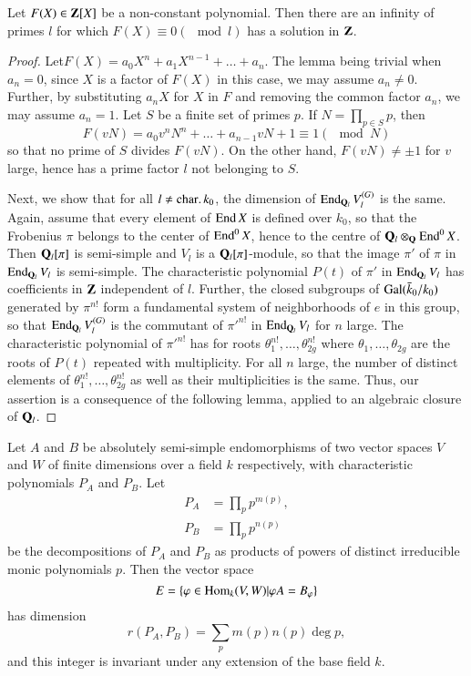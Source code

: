 \begin{lem}\label{apen1-lem5}
Let $F(X) \in \mathbf{Z}[X]$ be a non-constant polynomial. Then there are an infinity of primes $l$ for which $F(X) \equiv 0 (\mod l)$ has a solution in $\mathbf{Z}$.
\end{lem}

\begin{proof}
Let\pageoriginale $F(X) = a_0 X^n + a_1 X^{n-1} + \ldots + a_n$. The lemma being trivial when $a_n =0$, since $X$ is a factor of $F(X)$ in this case, we may assume $a_n \neq 0$. Further, by substituting $a_n X$ for $X$ in $F$ and removing the common factor $a_n$, we may assume $a_n =1$. Let $S$ be a finite set of primes $p$. If $N = \prod\limits_{p\in S} p$, then
$$
F(vN) = a_0 v^n N^n+ \ldots + a_{n-1} v N+ 1 \equiv 1 (\mod N)
$$
so that no prime of $S$ divides $F(vN)$. On the other hand, $F(vN) \neq \pm 1$ for $v$ large, hence has a prime factor $l$ not belonging to $S$.

Next, we show that for all $l \neq \operatorname{char} \ldotp k_0$, the dimension of $\operatorname{End}_{\mathbf{Q}_l} V_l^{(G)}$ is the same. Again, assume that every element of $\operatorname{End} X$ is defined over $k_0$, so that the Frobenius $\pi$ belongs to the center of $\operatorname{End}^0 X$, hence to the centre of $\mathbf{Q}_l \otimes_{\mathbf{Q}} \operatorname{End}^0 X$. Then $\mathbf{Q}_l [\pi]$ is semi-simple and $V_l$ is a $\mathbf{Q}_l[\pi]$-module, so that the image $\pi'$ of $\pi$ in $\operatorname{End}_{\mathbf{Q}_l} V_l$ is semi-simple. The characteristic polynomial $P(t)$ of $\pi'$ in $\operatorname{End}_{\mathbf{Q}_l} V_l$ has coefficients in $\mathbf{Z}$ independent of $l$. Further, the closed subgroups of $\operatorname{Gal} (\bar{k}_0/k_0)$ generated by $\pi^{n!}$ form a fundamental system of neighborhoods of $e$ in this group, so that $\operatorname{End}_{\mathbf{Q}_l} V^{(G)}_l$ is the commutant of $\pi'^{n!}$ in $\operatorname{End}_{\mathbf{Q}_l} V_l$ for $n$ large. The characteristic polynomial of $\pi'^{n!}$ has for roots $\theta^{n!}_1, \ldots, \theta^{n!}_{2g}$ where $\theta_1, \ldots, \theta_{2g}$ are the roots of $P(t)$ repeated with multiplicity. For all $n$ large, the number of distinct elements of $\theta^{n!}_1, \ldots, \theta^{n!}_{2g}$ as well as their multiplicities is the same. Thus, our assertion is a  consequence of the following lemma, applied to an algebraic closure of $\mathbf{Q}_l$.
\end{proof}

\begin{lem}\label{apen1-lem6}
Let $A$ and $B$ be absolutely semi-simple endomorphisms of two vector spaces $V$ and $W$ of finite dimensions over a field $k$ respectively, with characteristic polynomials $P_A$ and $P_B$. Let 
\begin{align*} 
P_A & = \prod\limits_{p} p^{m(p)},\\
P_B & = \prod\limits_{p} p^{n(p)}
\end{align*}
be the decompositions of $P_A$ and $P_B$ as products of powers of distinct irreducible monic polynomials $p$. Then the vector space
$$
E = \{\varphi \in \operatorname{Hom}_k (V,W) | \varphi A = B_\varphi\}
$$
has dimension\pageoriginale
$$
r (P_A, P_B) = \sum\limits_p m (p) n (p) \deg p,
$$
and this integer is invariant under any extension of the base field $k$.
\end{lem}

